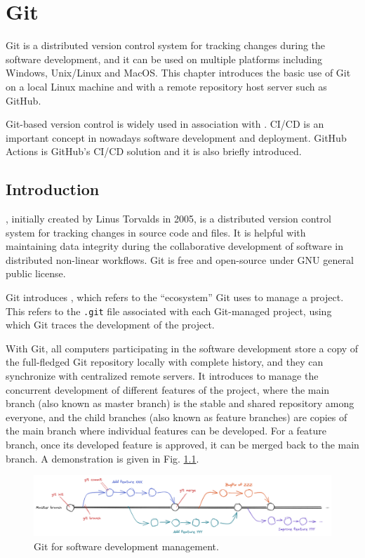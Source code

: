 \chapter{Git} \label{ch:git}

Git is a distributed version control system for tracking changes during the software development, and it can be used on multiple platforms including Windows, Unix/Linux and MacOS. This chapter introduces the basic use of Git on a local Linux machine and with a remote repository host server such as GitHub. 

Git-based version control is widely used in association with . CI/CD is an important concept in nowadays software development and deployment. GitHub Actions is GitHub's CI/CD solution and it is also briefly introduced.

\section{Introduction}

, initially created by Linus Torvalds in 2005, is a distributed version control system for tracking changes in source code and files. It is helpful with maintaining data integrity during the collaborative development of software in distributed non-linear workflows. Git is free and open-source under GNU general public license.

Git introduces , which refers to the ``ecosystem'' Git uses to manage a project. This refers to the \verb|.git| file associated with each Git-managed project, using which Git traces the development of the project. 

With Git, all computers participating in the software development store a copy of the full-fledged Git repository locally with complete history, and they can synchronize with centralized remote servers. It introduces  to manage the concurrent development of different features of the project, where the main branch (also known as master branch) is the stable and shared repository among everyone, and the child branches (also known as feature branches) are copies of the main branch where individual features can be developed. For a feature branch, once its developed feature is approved, it can be merged back to the main branch. A demonstration is given in Fig. \ref{ch:sma:fig:gitflow}.
\begin{figure}[htbp]
	\centering
	\includegraphics[width=350pt]{chapters/part-3/figures/gitflow.png}
	\caption{Git for software development management.} \label{ch:sma:fig:gitflow}
\end{figure}

